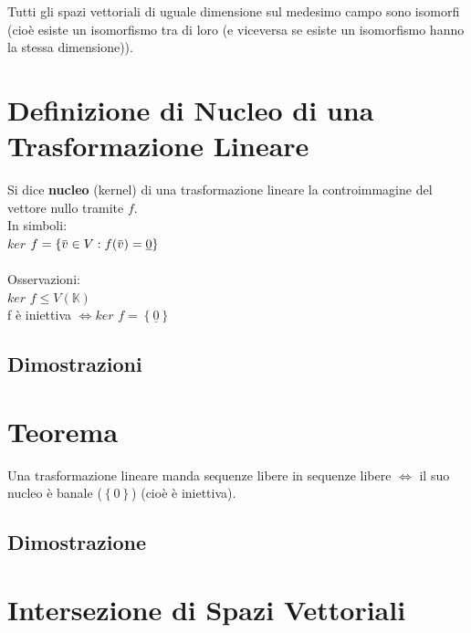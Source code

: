 \documentclass[a4paper, twoside, italian, 11pt]{book}
\newcommand{\braces}[1] {\left \{ #1 \right \}}
\newcommand{\overbar}[1] {\mkern 1.5mu\overline{\mkern-1.5mu#1\mkern-1.5mu}\mkern 1.5mu}
\newcommand{\K}{\mathbb K}
\begin{document}
\noindent
Tutti gli spazi vettoriali di uguale dimensione sul medesimo campo sono isomorfi (cioè esiste un isomorfismo tra di loro (e viceversa se esiste un isomorfismo hanno la stessa dimensione)).



\section{Definizione di Nucleo di una Trasformazione Lineare}

Si dice \textbf{nucleo} (kernel) di una trasformazione lineare la controimmagine del vettore nullo tramite $f$. \\

\noindent
In simboli: \\

$ker$ $f = \braces{\overbar v \in V : f(\overbar v) = \underline 0}$ \\\\

\noindent
Osservazioni: \\

$ker$ $f \leq V(\K)$ \\

f è iniettiva $\iff ker$ $f = \braces{\underline 0}$


\subsection{Dimostrazioni}




\section{Teorema}

Una trasformazione lineare manda sequenze libere in sequenze libere $\iff$ il suo nucleo è banale ($\braces{0}$) (cioè è iniettiva).


\subsection{Dimostrazione}




\section{Intersezione di Spazi Vettoriali}
\end{document}
